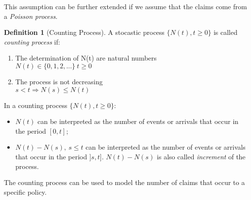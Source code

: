 \documentclass[a4paper, nobind]{templates/ociamthesis}
\providecommand{\tightlist}{%
  \setlength{\itemsep}{0pt}\setlength{\parskip}{0pt}}
\theoremstyle{definition}
\newtheorem{definition}{Definition}[chapter]
\theoremstyle{definition}
\theoremstyle{definition}
\theoremstyle{remark}
\begin{document}
This assumption can be further extended if we assume that the claims come from a \emph{Poisson process}.

\begin{definition}[Counting Process]
\label{def:def-process-count} \iffalse (Counting Process) \fi{} A stocastic process \(\{N(t), t\ge0\}\) is called \textit{counting process} if:

\begin{enumerate}
\item The determination of N(t) are natural numbers \\
      $N(t) \in \{ 0, 1, 2, ... \} \ t\ge 0$
\item The process is not decreasing \\
      $s < t \Rightarrow N(s) \le N(t)$
\end{enumerate}
\end{definition}

In a counting process \(\{N(t), t\ge0\}\):

\begin{itemize}
\tightlist
\item
  \(N(t)\) can be interpreted as the number of events or arrivals that occur in the period \([0, t]\);
\item
  \(N(t) - N(s), \ s\le t\) can be interpreted as the number of events or arrivals that occur in the period \(]s, t]\). \(N(t) - N(s)\) is also called \emph{increment} of the process.
\end{itemize}

The counting process can be used to model the number of claims that occur to a specific policy.
\end{document}
